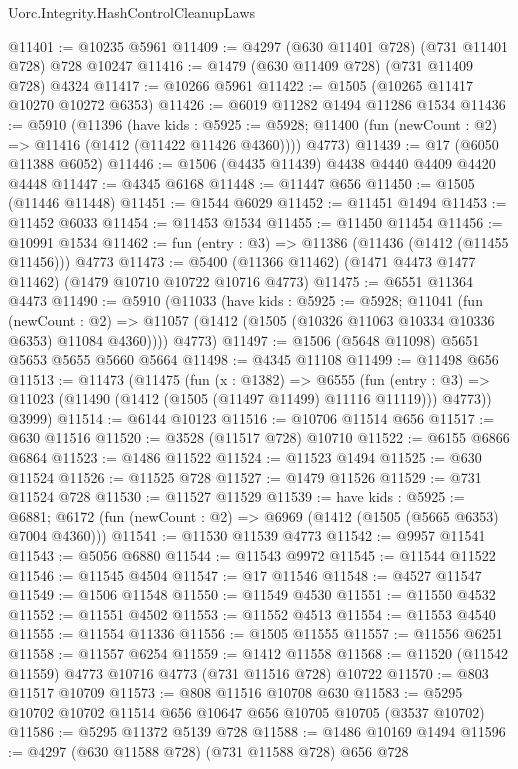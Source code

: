 \begin{lexlean}{Uorc.Integrity.HashControlCleanupLaws}
\begin{coremodule}
@11401 := @10235 @5961
@11409 := @4297 (@630 @11401 @728) (@731 @11401 @728) @728 @10247
@11416 := @1479 (@630 @11409 @728) (@731 @11409 @728) @4324
@11417 := @10266 @5961
@11422 := @1505 (@10265 @11417 @10270 @10272 @6353)
@11426 := @6019 @11282 @1494 @11286 @1534
@11436 := @5910
    (@11396
      (have kids : @5925 := @5928;
      @11400 (fun (newCount : @2) => @11416 (@1412 (@11422 @11426 @4360))))
      @4773)
@11439 := @17 (@6050 @11388 @6052)
@11446 := @1506 (@4435 @11439) @4438 @4440 @4409 @4420 @4448
@11447 := @4345 @6168
@11448 := @11447 @656
@11450 := @1505 (@11446 @11448)
@11451 := @1544 @6029
@11452 := @11451 @1494
@11453 := @11452 @6033
@11454 := @11453 @1534
@11455 := @11450 @11454
@11456 := @10991 @1534
@11462 := fun (entry : @3) => @11386 (@11436 (@1412 (@11455 @11456))) @4773
@11473 := @5400 (@11366 @11462) (@1471 @4473 @1477 @11462) (@1479 @10710 @10722 @10716 @4773)
@11475 := @6551 @11364 @4473
@11490 := @5910
    (@11033
      (have kids : @5925 := @5928;
      @11041
        (fun (newCount : @2) =>
        @11057 (@1412 (@1505 (@10326 @11063 @10334 @10336 @6353) @11084 @4360))))
      @4773)
@11497 := @1506 (@5648 @11098) @5651 @5653 @5655 @5660 @5664
@11498 := @4345 @11108
@11499 := @11498 @656
@11513 := @11473
    (@11475
      (fun (x : @1382) =>
      @6555
        (fun (entry : @3) => @11023 (@11490 (@1412 (@1505 (@11497 @11499) @11116 @11119))) @4773))
      @3999)
@11514 := @6144 @10123
@11516 := @10706 @11514 @656
@11517 := @630 @11516
@11520 := @3528 (@11517 @728) @10710
@11522 := @6155 @6866 @6864
@11523 := @1486 @11522
@11524 := @11523 @1494
@11525 := @630 @11524
@11526 := @11525 @728
@11527 := @1479 @11526
@11529 := @731 @11524 @728
@11530 := @11527 @11529
@11539 := have kids : @5925 := @6881;
  @6172 (fun (newCount : @2) => @6969 (@1412 (@1505 (@5665 @6353) @7004 @4360)))
@11541 := @11530 @11539 @4773
@11542 := @9957 @11541
@11543 := @5056 @6880
@11544 := @11543 @9972
@11545 := @11544 @11522
@11546 := @11545 @4504
@11547 := @17 @11546
@11548 := @4527 @11547
@11549 := @1506 @11548
@11550 := @11549 @4530
@11551 := @11550 @4532
@11552 := @11551 @4502
@11553 := @11552 @4513
@11554 := @11553 @4540
@11555 := @11554 @11336
@11556 := @1505 @11555
@11557 := @11556 @6251
@11558 := @11557 @6254
@11559 := @1412 @11558
@11568 := @11520 (@11542 @11559) @4773 @10716 @4773 (@731 @11516 @728) @10722
@11570 := @803 @11517 @10709
@11573 := @808 @11516 @10708 @630
@11583 := @5295 @10702 @10702 @11514 @656 @10647 @656 @10705 @10705 (@3537 @10702)
@11586 := @5295 @11372 @5139 @728
@11588 := @1486 @10169 @1494
@11596 := @4297 (@630 @11588 @728) (@731 @11588 @728) @656 @728

\end{coremodule}
\end{lexlean}
